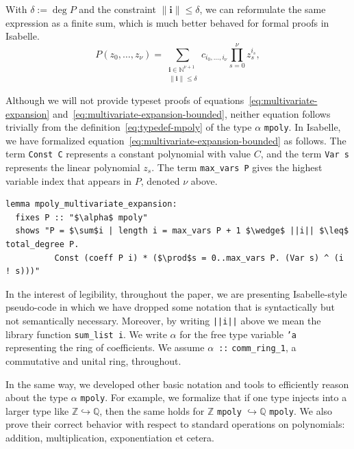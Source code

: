\documentclass[a4paper,USenglish,cleveref,autoref,thm-restate]{lipics-v2021}
\newcommand{\N}{{\mathbb N}}
\newcommand{\Z}{{\mathbb Z}}
\begin{document}
With $\delta := \deg P$ and the constraint $\|\mathbf{i}\| \leq \delta$, we can reformulate the same expression as a finite sum, which is much better behaved for formal proofs in Isabelle.
\begin{equation}\label{eq:multivariate-expansion-bounded}
    P(z_0, \ldots, z_\nu) = \sum_{\substack{\mathbf{i} \in \N^{\nu+1} \\ \|\mathbf{i}\| \le \delta}} c_{i_0, \ldots, i_\nu} \prod_{s=0}^\nu z_s^{i_s},
\end{equation}

Although we will not provide typeset proofs of equations~\eqref{eq:multivariate-expansion} and~\eqref{eq:multivariate-expansion-bounded}, neither equation follows trivially from the definition~\eqref{eq:typedef-mpoly} of the type $\alpha$ \texttt{mpoly}. In Isabelle, we have formalized equation~\eqref{eq:multivariate-expansion-bounded} as follows. The term \texttt{Const C} represents a constant polynomial with value $C$, and the term \texttt{Var s} represents the linear polynomial $z_s$. The term \texttt{max\_vars P} gives the highest variable index that appears in $P$, denoted $\nu$ above.

\begin{lstlisting}
lemma mpoly_multivariate_expansion:
  fixes P :: "$\alpha$ mpoly"
  shows "P = $\sum$i | length i = max_vars P + 1 $\wedge$ ||i|| $\leq$ total_degree P.
          Const (coeff P i) * ($\prod$s = 0..max_vars P. (Var s) ^ (i ! s)))"
\end{lstlisting}

\begin{remark}
    In the interest of legibility, throughout the paper, we are presenting Isabelle-style pseudo-code in which we have dropped some notation that is syntactically but not semantically necessary.
    Moreover, by writing \texttt{||i||} above we mean the library function \texttt{sum\_list i}. We write $\alpha$ for the free type variable \texttt{'a} representing the ring of coefficients. We assume $\alpha$~\texttt{::} \texttt{comm\_ring\_1}, a commutative and unital ring, throughout.
\end{remark}


In the same way, we developed other basic notation and tools to efficiently reason about the type $\alpha$ \texttt{mpoly}. For example, we formalize that if one type injects into a larger type like $\Z \hookrightarrow \mathbb{Q}$, then the same holds for $\Z$ \texttt{mpoly} $\hookrightarrow \mathbb{Q}$ \texttt{mpoly}. We also prove their correct behavior with respect to standard operations on polynomials: addition, multiplication, exponentiation et cetera.
\end{document}
